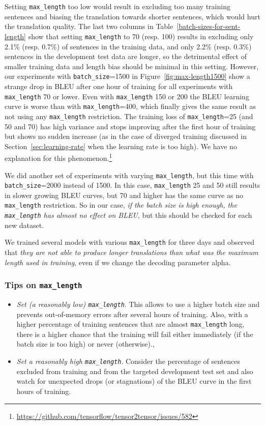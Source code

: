 \documentclass{pbmlarxiv} \pdfoutput=1
\def\recommend#1{\textsl{#1}}
\def\Sref#1{Section~\ref{#1}}
\def\Tref#1{Table~\ref{#1}}
\def\Fref#1{Figure~\ref{#1}}
\begin{document}
Setting \verb|max_length| too low would result in excluding too many training sentences
 and biasing the translation towards shorter sentences,
 which would hurt the translation quality.
The last two columns in \Tref{batch-sizes-for-sent-length} show
 that setting \verb|max_length| to 70 (resp. 100) results in excluding only
 2.1\% (resp. 0.7\%) of sentences in the training data,
 and only 2.2\% (resp. 0.3\%) sentences in the development test data are longer,
 so the detrimental effect of smaller training data and length bias should be minimal in this setting.
However, our experiments with \verb|batch_size|=1500 in \Fref{fig:max-length1500}
 show a strange drop in BLEU after one hour of training for all experiments with \verb|max_length| 70 or lower.
Even with \verb|max_length| 150 or 200 the BLEU learning curve is worse than with \verb|max_length|=400,
 which finally gives the same result as not using any \verb|max_length| restriction.
The training loss of \verb|max_length|=25 (and 50 and 70) has high variance
 and stops improving after the first hour of training
 but shows no sudden increase
 (as in the case of diverged training discussed in \Sref{sec:learning-rate} when the learning rate is too high).
We have no explanation for this phenomenon.\footnote{
 \url{https://github.com/tensorflow/tensor2tensor/issues/582}
}

We did another set of experiments with varying \verb|max_length|,
 but this time with \verb|batch_size|=2000 instead of 1500.
In this case, \verb|max_length| 25 and 50 still results in slower growing BLEU curves,
 but 70 and higher has the same curve as no \verb|max_length| restriction.
So in our case, \recommend{if the batch size is high enough, the \texttt{max\_length} has almost no effect on BLEU},
 but this should be checked for each new dataset.

We trained several models with various \verb|max_length| for three days
 and observed that \recommend{they are not able to produce longer translations
 than what was the maximum length used in training},
 even if we change the decoding parameter alpha.

\subsubsection*{Tips on \texttt{max\_length}}
\begin{itemize}
\item \recommend{Set (a reasonably low) \texttt{max\_length}}.
 This allows to use a higher batch size and prevents out-of-memory errors after several hours of training.
 Also, with a higher percentage of training sentences that are almost \verb|max_length| long,
  there is a higher chance
  that the training will fail either immediately (if the batch size is too high) or never (otherwise).,
\item \recommend{Set a reasonably high \texttt{max\_length}}.
 Consider the percentage of sentences excluded from training and from the targeted development test set
 and also watch for unexpected drops (or stagnations) of the BLEU curve in the first hours of training.
\end{itemize}
\end{document}
